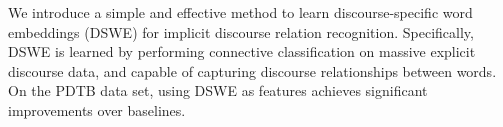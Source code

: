We introduce a simple and effective method to learn discourse-specific word embeddings (DSWE) for implicit discourse relation recognition. Specifically, DSWE is learned by performing connective classification on massive explicit discourse data, and capable of capturing discourse relationships between words. On the PDTB data set, using DSWE as features achieves significant improvements over baselines.
